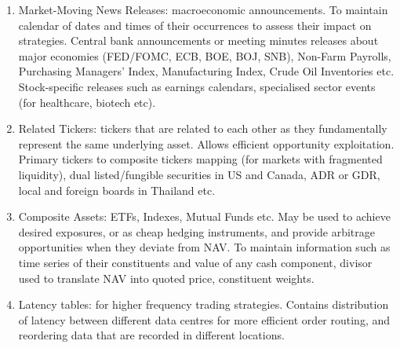 \begin{enumerate}[label=\roman*.]
\item Market-Moving News Releases: macroeconomic announcements. To maintain calendar of dates and times of their occurrences to assess their impact on strategies. Central bank announcements or meeting minutes releases about major economies (FED/FOMC, ECB, BOE, BOJ, SNB), Non-Farm Payrolls, Purchasing Managers' Index, Manufacturing Index, Crude Oil Inventories etc.\\
Stock-specific releases such as earnings calendars, specialised sector events (for healthcare, biotech etc).
\item Related Tickers: tickers that are related to each other as they fundamentally represent the same underlying asset. Allows efficient opportunity exploitation. Primary tickers to composite tickers mapping (for markets with fragmented liquidity), dual listed/fungible securities in US and Canada, ADR or GDR, local and foreign boards in Thailand etc.
\item Composite Assets: ETFs, Indexes, Mutual Funds etc. May be used to achieve desired exposures, or as cheap hedging instruments, and provide arbitrage opportunities when they deviate from NAV. To maintain information such as time series of their constituents and value of any cash component, divisor used to translate NAV into quoted price, constituent weights.
\item Latency tables: for higher frequency trading strategies. Contains distribution of latency between different data centres for more efficient order routing, and reordering data that are recorded in different locations.
\end{enumerate}

